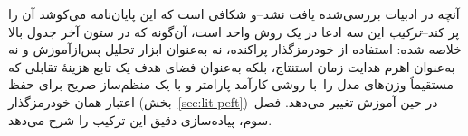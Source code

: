 آنچه در ادبیات بررسی‌شده یافت نشد--و شکافی است که این پایان‌نامه می‌کوشد آن را پر کند--\emph{ترکیب} این سه ادعا در یک روش واحد است، آن‌گونه که در ستون آخر جدول بالا خلاصه شده: استفاده از خودرمزگذار پراکنده، نه به‌عنوان ابزار تحلیل پس‌ازآموزش و نه به‌عنوان اهرم هدایت زمان استنتاج، بلکه به‌عنوان فضای هدف یک تابع هزینهٔ تقابلی که مستقیماً وزن‌های مدل را--با روشی کارآمد پارامتر و با یک منظم‌ساز صریح برای حفظ اعتبار همان خودرمزگذار (بخش~\ref{sec:lit-peft})--در حین آموزش تغییر می‌دهد. فصل سوم، پیاده‌سازی دقیق این ترکیب را شرح می‌دهد.
